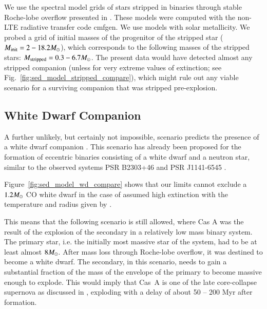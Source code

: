 \documentclass{aa}
\begin{document}
We use the spectral model grids of stars stripped in binaries through stable Roche-lobe overflow presented in \citet[][see also \citealt{2017A&A...608A..11G}]{2018A&A...615A..78G}. These models were computed with the non-LTE radiative transfer code \gls{cmfgen}. We use models with solar metallicity.
We probed a grid of initial masses of the progenitor of the stripped star ($M_\textrm{init}= 2 - 18.2\hbox{$M_{\odot}$}$), which corresponds to the following masses of the stripped stars: $M_\textrm{stripped}= 0.3 - 6.7\hbox{$M_{\odot}$}$. The present data would have detected almost any stripped companion (unless for very extreme values of extinction; see Fig.~\ref{fig:sed_model_stripped_compare}), which might rule out any viable scenario for a surviving companion that was stripped pre-explosion.


\subsection{White Dwarf Companion}

A further unlikely, but certainly not impossible, scenario predicts the presence of a white dwarf companion \citep[at most a few percent for all stripped \glspl{sn}; ][]{2017ApJ...842..125Z}. This scenario has already been proposed for the formation of eccentric binaries consisting of a white dwarf and a neutron star, similar to the observed systems PSR B2303+46 and PSR J1141-6545 \citep[e.g.][]{1999MNRAS.309...26P,2000A&A...355..236T, 2006MNRAS.372..715C}.

Figure~\ref{fig:sed_model_wd_compare} shows that our limits cannot exclude a $1.2\hbox{$M_{\odot}$}$ CO white dwarf in the case of assumed high extinction \citep[corresponding to a 7\msun\ initial mass; see Figure 8 in ][]{2009ApJ...693..355W} with the temperature and radius given by \citet[][~K; radius=4300~km]{2011A&A...531L..19T}.

This means that the following scenario is still allowed, where Cas A was the result of the explosion of the secondary in a relatively low mass binary system.  The primary star, i.e. the initially most massive star of the system, had to be at least almost $8\hbox{$M_{\odot}$}$. After mass loss through Roche-lobe overflow, it was destined to become a white dwarf. The secondary, in this scenario, needs to gain a substantial fraction of the mass of the envelope of the primary to become massive enough to explode. This would imply that Cas~A is one of the late core-collapse supernova as discussed in \citet{2017A&A...601A..29Z}, exploding with a delay of about 50 -- 200 Myr after formation.
\end{document}
